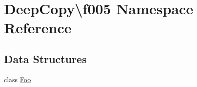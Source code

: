 \hypertarget{namespace_deep_copy_1_1f005}{}\section{Deep\+Copy\textbackslash{}f005 Namespace Reference}
\label{namespace_deep_copy_1_1f005}
\subsection*{Data Structures}
\begin{DoxyCompactItemize}
\item 
class \mbox{\hyperlink{class_deep_copy_1_1f005_1_1_foo}{Foo}}
\end{DoxyCompactItemize}
